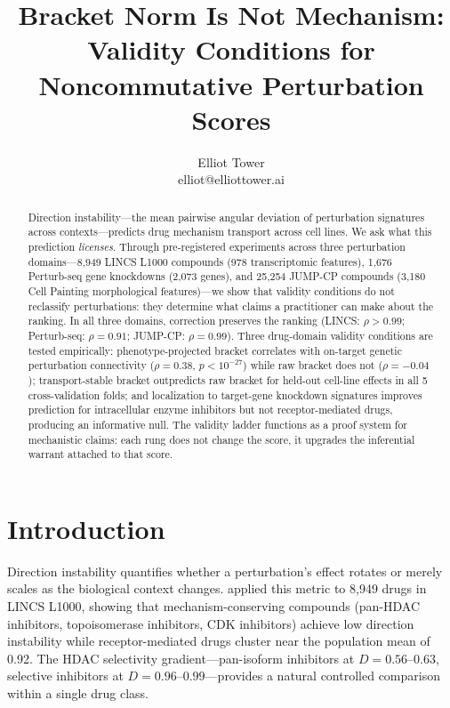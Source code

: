 \documentclass{article}
\title{Bracket Norm Is Not Mechanism:\\ Validity Conditions for Noncommutative Perturbation Scores}
\author{\name Elliot Tower \\
      \email elliot@elliottower.ai}
\begin{document}
\maketitle

\begin{abstract}
Direction instability---the mean pairwise angular deviation of perturbation
signatures across contexts---predicts drug mechanism transport across cell
lines. We ask what this prediction \emph{licenses}. Through pre-registered
experiments across three perturbation domains---8{,}949 LINCS L1000
compounds (978 transcriptomic features), 1{,}676 Perturb-seq gene
knockdowns \citep{replogle2022mapping} (2{,}073 genes), and 25{,}254
JUMP-CP compounds (3{,}180 Cell Painting morphological features)---we show
that validity conditions do not reclassify perturbations: they determine
what claims a practitioner can make about the ranking. In all three domains,
correction preserves the ranking (LINCS: $\rho > 0.99$; Perturb-seq: $\rho
= 0.91$; JUMP-CP: $\rho = 0.99$). Three drug-domain validity conditions
are tested empirically: phenotype-projected bracket correlates with
on-target genetic perturbation connectivity ($\rho = 0.38$, $p < 10^{-27}$)
while raw bracket does not ($\rho = -0.04$); transport-stable bracket
outpredicts raw bracket for held-out cell-line effects in all 5
cross-validation folds; and localization to target-gene knockdown signatures
improves prediction for intracellular enzyme inhibitors but not
receptor-mediated drugs, producing an informative null. The validity
ladder functions as a proof system for mechanistic claims: each rung does not
change the score, it upgrades the inferential warrant attached to that score.
\end{abstract}

\section{Introduction}

Direction instability quantifies whether a perturbation's effect rotates or
merely scales as the biological context changes. \citet{tower2026bracket} applied this
metric to 8{,}949 drugs in LINCS L1000, showing that mechanism-conserving
compounds (pan-HDAC inhibitors, topoisomerase inhibitors, CDK inhibitors)
achieve low direction instability while receptor-mediated drugs cluster near
the population mean of 0.92. The HDAC selectivity gradient---pan-isoform
inhibitors at $D = 0.56$--$0.63$, selective inhibitors at $D = 0.96$--$0.99$---provides
a natural controlled comparison within a single drug class.
\end{document}
